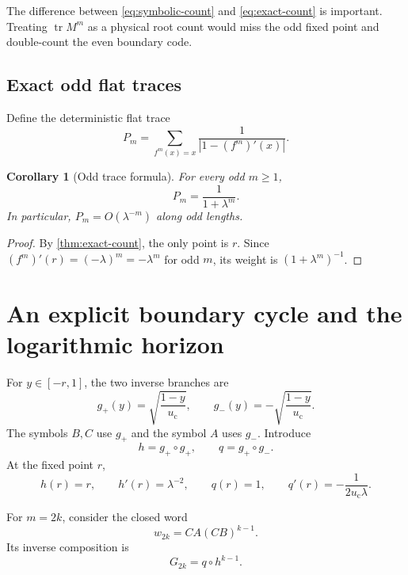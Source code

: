 \documentclass[11pt]{article}
\newtheorem{corollary}[theorem]{Corollary}
\theoremstyle{definition}
\theoremstyle{remark}
\newcommand{\uc}{u_{\mathrm c}}
\newcommand{\tr}{\operatorname{tr}}
\begin{document}
The difference between \eqref{eq:symbolic-count} and
\eqref{eq:exact-count} is important.  Treating $\tr M^m$ as a physical root
count would miss the odd fixed point and double-count the even boundary code.

\subsection{Exact odd flat traces}

Define the deterministic flat trace
\begin{equation}\label{eq:flat-trace}
 P_m=\sum_{f^m(x)=x}\frac{1}{|1-(f^m)'(x)|}.
\end{equation}

\begin{corollary}[Odd trace formula]
\label{cor:odd-trace}
For every odd $m\ge1$,
\begin{equation}\label{eq:odd-trace}
 P_m=\frac{1}{1+\lambda^m}.
\end{equation}
In particular, $P_m=O(\lambda^{-m})$ along odd lengths.
\end{corollary}

\begin{proof}
By \cref{thm:exact-count}, the only point is $r$.  Since
$(f^m)'(r)=(-\lambda)^m=-\lambda^m$ for odd $m$, its weight is
$(1+\lambda^m)^{-1}$.
\end{proof}

\section{An explicit boundary cycle and the logarithmic horizon}
\label{sec:boundary}

For $y\in[-r,1]$, the two inverse branches are
\begin{equation}\label{eq:inverse-branches}
 g_+(y)=\sqrt{\frac{1-y}{\uc}},
 \qquad
 g_-(y)=-\sqrt{\frac{1-y}{\uc}}.
\end{equation}
The symbols $B,C$ use $g_+$ and the symbol $A$ uses $g_-$.  Introduce
\begin{equation}\label{eq:hq}
 h=g_+\circ g_+,
 \qquad
 q=g_+\circ g_-.
\end{equation}
At the fixed point $r$,
\begin{equation}\label{eq:hq-data}
 h(r)=r,\qquad h'(r)=\lambda^{-2},\qquad
 q(r)=1,\qquad q'(r)=-\frac{1}{2\uc\lambda}.
\end{equation}

For $m=2k$, consider the closed word
\begin{equation}\label{eq:boundary-word}
 w_{2k}=CA(CB)^{k-1}.
\end{equation}
Its inverse composition is
\begin{equation}\label{eq:boundary-inverse-composition}
 G_{2k}=q\circ h^{k-1}.
\end{equation}
\end{document}

